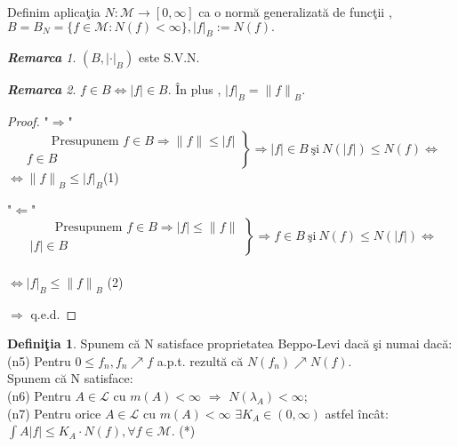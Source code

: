 \documentclass[ a4paper, 12pt]{report}
\theoremstyle{definition}
\newtheorem{definition}{\bf Defini\c tia}[section]
\theoremstyle{remark}
\newtheorem{remarc}{\bf Remarca}[section]
\numberwithin{equation}{section}
\begin{document}
Definim aplica\c tia $N : \mathcal{M} \rightarrow [0,\infty]$ ca o norm\u a generalizat\u a de func\c tii ,\\ $B=B_N=\{f \in \mathcal{M} : N(f) < \infty\} , {\lvert f \rvert}_B := N(f).$
\begin{remarc}
$(B,{\lvert \cdot \rvert}_B)$ este S.V.N.
\end{remarc}
\begin{remarc}
$f \in B \Leftrightarrow \lvert f \rvert \in B.$ \^In plus , ${\lvert f \rvert}_B = {\lVert f \rVert}_B.$
\end{remarc}
\begin{proof}
"$\Rightarrow$"
\begin{equation*}
\left.\begin{aligned}
          \qquad\text{Presupunem $f \in B$} \Rightarrow {\lVert f \rVert} \leq \lvert f \rvert\\
         f \in B
       \end{aligned}
\right\}
\Rightarrow \lvert f \rvert \in B \ \mbox{\c si}\  N(\lvert f \rvert) \leq N(f) \Leftrightarrow
\end{equation*}
$\Leftrightarrow {\lVert f \rVert}_B \leq {\lvert f \rvert}_B$\hspace{2mm}(1)

"$\Leftarrow$"
\begin{equation*}
\left.\begin{aligned}
          \qquad\text{Presupunem $f \in B$} \Rightarrow {\lvert f \rvert} \leq \lVert f \rVert\\
         \lvert f \rvert \in B
       \end{aligned}
\right\}
\Rightarrow f \in B \ \mbox{\c si}\  N(f) \leq N(\lvert f \rvert)\Leftrightarrow
\end{equation*}
\\
$\Leftrightarrow {\lvert f \rvert}_B \leq {\lVert f \rVert}_B$ (2)

$\Rightarrow$ q.e.d.
\end{proof}
\begin{definition}
Spunem c\u a N satisface proprietatea Beppo-Levi dac\u a \c si numai dac\u a:\\
(n5) Pentru $0 \leq f_n ,  f_n \nearrow f$ a.p.t. rezult\u a c\u a  $N(f_n) \nearrow N(f).$\\
Spunem c\u a N satisface:\\
(n6) Pentru $A \in \mathcal{L}$ cu $m(A)<\infty$ $\Rightarrow$ $N(\lambda_A)<\infty;$\\
(n7) Pentru orice $A \in \mathcal{L}$ cu $m(A)<\infty$    $\exists  K_A \in (0,\infty)$ astfel \^inc\^at:\\
$\int\limits{A}{} \lvert f \rvert \leq K_A \cdot N(f),\forall f \in \mathcal{M}.$ \hspace{3mm}(*)
\end{definition}
\end{document}
